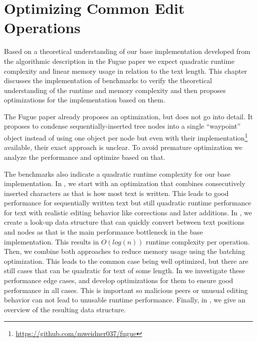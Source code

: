 \chapter{Optimizing Common Edit Operations} \label{optimization}

Based on a theoretical understanding of our base implementation developed from the algorithmic description in the Fugue paper \cite[Algorithm~1]{2023-weidner-minimizing-interleaving} we expect quadratic runtime complexity and linear memory usage in relation to the text length. This chapter discusses the implementation of benchmarks to verify the theoretical understanding of the runtime and memory complexity and then proposes optimizations for the implementation based on them.

The Fugue paper already proposes an optimization, but does not go into detail. It proposes to condense sequentially-inserted tree nodes into a single ``waypoint'' object instead of using one object per node \cite[Section 5]{2023-weidner-minimizing-interleaving} but even with their implementation\footnote{\url{https://github.com/mweidner037/fugue}} available, their exact approach is unclear. To avoid premature optimization we analyze the performance and optimize based on that.

The benchmarks also indicate a quadratic runtime complexity for our base implementation.
In , we start with an optimization that combines consecutively inserted characters  as that is how most text is written. This leads to good performance for sequentially written text but still quadratic runtime performance for text with realistic editing behavior like corrections and later additions.
In , we create a look-up data structure that can quickly convert between text positions and nodes as that is the main performance bottleneck in the base implementation. This results in $O(log(n))$ runtime complexity per operation. Then, we combine both approaches to reduce memory usage using the batching optimization. This leads to the common case being well optimized, but there are still cases that can be quadratic for text of some length.
In  we investigate these performance edge cases, and develop optimizations for them to ensure good performance in all cases. This is important so malicious peers or unusual editing behavior can not lead to unusable runtime performance.
Finally, in , we give an overview of the resulting data structure.

